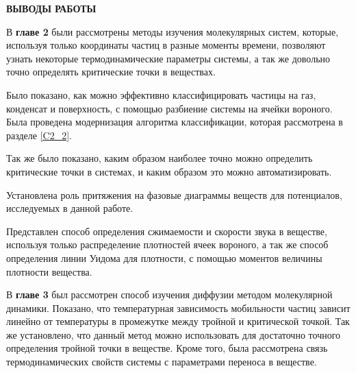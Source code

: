 \newpage
\begin{center}
\textbf{ВЫВОДЫ РАБОТЫ}
\end{center}



В \textbf{главе 2} были рассмотрены методы изучения молекулярных систем, которые, используя только координаты частиц в разные моменты времени, позволяют узнать некоторые термодинамические параметры системы, а так же довольно точно определять критические точки в веществах. 

Было показано, как можно эффективно классифицировать частицы на газ, конденсат и поверхность, с помощью разбиение системы на ячейки вороного. Была проведена модернизация алгоритма классификации, которая рассмотрена в разделе \ref{C2_2}.

Так же было показано, каким образом наиболее точно можно определить критические точки в системах, и каким образом это можно автоматизировать. 

Установлена роль притяжения на фазовые диаграммы веществ для потенциалов, исследуемых в данной работе.

Представлен способ определения сжимаемости и скорости звука в веществе, используя только распределение плотностей ячеек вороного, а так же способ определения линии Уидома для плотности, с помощью моментов величины плотности вещества.

В \textbf{главе 3} был рассмотрен способ изучения диффузии методом молекулярной динамики.
Показано, что температурная зависимость мобильности частиц зависит линейно от температуры в промежутке между тройной и критической точкой. Так же установлено, что данный метод можно использовать для достаточно точного определения тройной точки в веществе. Кроме того, была рассмотрена связь термодинамических свойств системы с параметрами переноса в веществе. 
